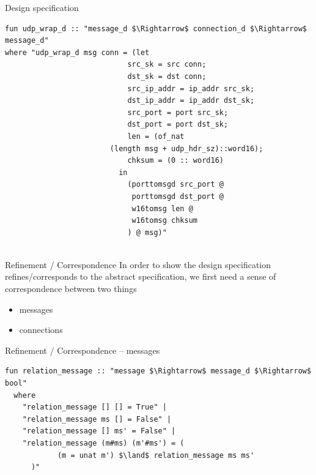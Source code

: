 \documentclass{beamer}
\begin{document}


\begin{frame}[fragile]{Design specification}
    \begin{lstlisting}[language=isabelle]
fun udp_wrap_d :: "message_d $\Rightarrow$ connection_d $\Rightarrow$ message_d"
where "udp_wrap_d msg conn = (let
                            src_sk = src conn;
                            dst_sk = dst conn;
                            src_ip_addr = ip_addr src_sk;
                            dst_ip_addr = ip_addr dst_sk;
                            src_port = port src_sk;
                            dst_port = port dst_sk;
                            len = (of_nat
                        (length msg + udp_hdr_sz)::word16);
                            chksum = (0 :: word16)
                          in
                            (porttomsgd src_port @
                             porttomsgd dst_port @
                             w16tomsg len @
                             w16tomsg chksum
                            ) @ msg)"


    \end{lstlisting}
\end{frame}

\begin{frame}{Refinement / Correspondence}
In order to show the design specification refines/corresponds to the abstract specification,
we first need a sense of correspondence between two things
\begin{itemize}
    \item messages
    \item connections
\end{itemize}
\end{frame}

\begin{frame}[fragile]{Refinement / Correspondence -- messages}
    
    \begin{lstlisting}[language=isabelle]
fun relation_message :: "message $\Rightarrow$ message_d $\Rightarrow$ bool"
  where
    "relation_message [] [] = True" |
    "relation_message ms [] = False" |
    "relation_message [] ms' = False" |
    "relation_message (m#ms) (m'#ms') = (
            (m = unat m') $\land$ relation_message ms ms'
      )"


    \end{lstlisting}
\end{frame}
\end{document}
